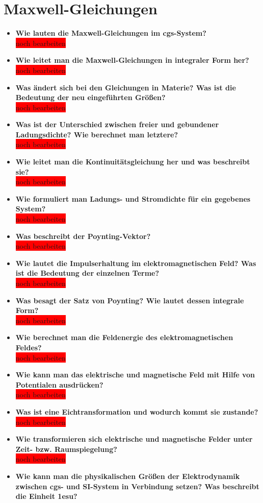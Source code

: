 \documentclass[german]{latex4ei/latex4ei_sheet}
\begin{document}
\section{Maxwell-Gleichungen}
\begin{itemize}
	\item \textbf{Wie lauten die Maxwell-Gleichungen im cgs-System?}\\\colorbox{red}{noch bearbeiten}
	\item \textbf{Wie leitet man die Maxwell-Gleichungen in integraler Form her?}\\\colorbox{red}{noch bearbeiten}
	\item \textbf{Was ändert sich bei den Gleichungen in Materie? Was ist die Bedeutung der neu eingeführten Größen?}\\\colorbox{red}{noch bearbeiten}
	\item \textbf{Was ist der Unterschied zwischen freier und gebundener Ladungsdichte? Wie berechnet man letztere?}\\\colorbox{red}{noch bearbeiten}
	\item \textbf{Wie leitet man die Kontinuitätsgleichung her und was beschreibt sie?}\\\colorbox{red}{noch bearbeiten}
	\item \textbf{Wie formuliert man Ladungs- und Stromdichte für ein gegebenes System?}\\\colorbox{red}{noch bearbeiten}
	\item \textbf{Was beschreibt der Poynting-Vektor?}\\\colorbox{red}{noch bearbeiten}
	\item \textbf{Wie lautet die Impulserhaltung im elektromagnetischen Feld? Was ist die Bedeutung der einzelnen Terme?}\\\colorbox{red}{noch bearbeiten}
	\item \textbf{Was besagt der Satz von Poynting? Wie lautet dessen integrale Form?}\\\colorbox{red}{noch bearbeiten}
	\item \textbf{Wie berechnet man die Feldenergie des elektromagnetischen Feldes?}\\\colorbox{red}{noch bearbeiten}
	\item \textbf{Wie kann man das elektrische und magnetische Feld mit Hilfe von Potentialen ausdrücken?}\\\colorbox{red}{noch bearbeiten}
	\item \textbf{Was ist eine Eichtransformation und wodurch kommt sie zustande?}\\\colorbox{red}{noch bearbeiten}
	\item \textbf{Wie transformieren sich elektrische und magnetische Felder unter Zeit- bzw. Raumspiegelung?}\\\colorbox{red}{noch bearbeiten}
	\item \textbf{Wie kann man die physikalischen Größen der Elektrodynamik zwischen cgs- und SI-System in Verbindung setzen? Was beschreibt die Einheit 1esu?}
\end{itemize}
\end{document}
